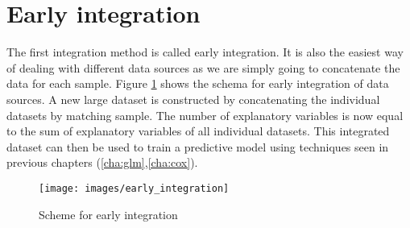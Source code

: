 \section{Early integration}
\label{sec:integration-early}
The first integration method is called early integration. It is also the easiest way of dealing with different data sources as we are simply going to concatenate the data for each sample. Figure \ref{fig:integration-early} shows the schema for early integration of data sources. A new large dataset is constructed by concatenating the individual datasets by matching sample. The number of explanatory variables is now equal to the sum of explanatory variables of all individual datasets. This integrated dataset can then be used to train a predictive model using techniques seen in previous chapters (\ref{cha:glm},\ref{cha:cox}).
\begin{figure}
	\centering
	\texttt{[image: images/early\_integration]}
	\caption{Scheme for early integration}
	\label{fig:integration-early}
\end{figure}
